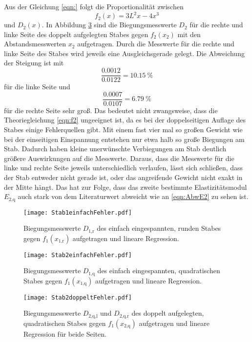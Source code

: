 Aus der Gleichung \eqref{eqn:} folgt die Proportionalität zwischen
\begin{equation}
  f_2(x) = 3L^2x - 4x^3
  \label{eqn:f2}
\end{equation}
und $D_2(x)$. In Abbildung \ref{fig:Stab2doppeltFehler} sind die
Biegungsmesswerte $D_2$ für die rechte und linke Seite des doppelt
aufgelegten Stabes gegen $f_2(x_2)$ mit den Abstandsmesswerten $x_2$
aufgetragen. Durch die Messwerte für die rechte und linke Seite des Stabes
wird jeweils eine Ausgleichsgerade gelegt.
Die Abweichung der Steigung ist mit
\begin{equation}
  \frac{0.0012}{0.0122} = \SI{10.15}{\percent}
\end{equation}
für die linke Seite und
\begin{equation}
  \frac{0.0007}{0.0107} = \SI{6.79}{\percent}
\end{equation}
für die rechte Seite sehr groß.
Das bedeutet nicht zwangsweise, dass die Theoriegleichung \eqref{eqn:f2}
ungeeignet ist, da es bei der doppelseitigen Auflage des Stabes einige
Fehlerquellen gibt. Mit einem fast vier mal so großen Gewicht wie bei
der einseitigen Einspannung entstehen nur etwa halb so große Biegungen
am Stab. Dadurch haben kleine unerwünschte Verbiegungen am Stab deutlich größere
Auswirkungen auf die Messwerte. Daraus, dass die Messwerte für die linke und
rechte Seite jeweils unterschiedlich verlaufen, lässt sich schließen, dass
der Stab entweder nicht gerade ist, oder das angreifende Gewicht nicht exakt
in der Mitte hängt. Das hat zur Folge, dass das zweite bestimmte
Elastizitätsmodul $E_\text{2,q}$ auch stark von dem Literaturwert abweicht wie
an \eqref{eqn:AbwE2} zu sehen ist.

\begin{figure}
  \centering
  \texttt{[image: Stab1einfachFehler.pdf]}
  \caption{Biegungsmesswerte $D_\text{1,r}$ des einfach eingespannten, runden
  Stabes gegen $f_1(x_\text{1,r})$ aufgetragen und lineare Regression.}
  \label{fig:Stab1einfachFehler}
\end{figure}

\begin{figure}
  \centering
  \texttt{[image: Stab2einfachFehler.pdf]}
  \caption{Biegungsmesswerte $D_\text{1,q}$ des einfach eingespannten,
  quadratischen
  Stabes gegen $f_1(x_\text{1,q})$ aufgetragen und lineare Regression.}
  \label{fig:Stab2einfachFehler}
\end{figure}

\begin{figure}
  \centering
  \texttt{[image: Stab2doppeltFehler.pdf]}
  \caption{Biegungsmesswerte $D_\text{2,q,l}$ und $D_\text{2,q,r}$ des doppelt
  aufgelegten, quadratischen Stabes gegen $f_1(x_\text{2,q})$ aufgetragen und
  lineare Regression für beide Seiten.}
  \label{fig:Stab2doppeltFehler}
\end{figure}
